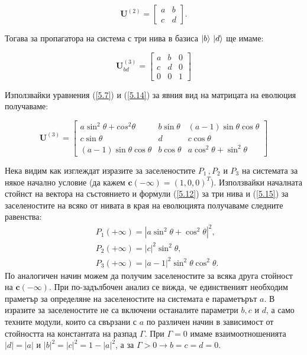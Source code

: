     \begin{equation}
        \textbf{U}^{(2)} = \begin{bmatrix}
            a & b\\
            c & d
        \end{bmatrix}.
    \end{equation}

    Тогава за пропагатора на система с три нива в базиса $\ket{b} \, \ket{d}$ ще имаме:

    \begin{equation} \label{5.14}
        \textbf{U}_{bd}^{(3)} = \begin{bmatrix}
            a & b & 0\\
            c & d & 0\\
            0 & 0 & 1
        \end{bmatrix}
    \end{equation}

    Използвайки уравнения (\ref{5.7}) и (\ref{5.14}) за явния вид на матрицата на еволюция получаваме:

    \begin{equation} \label{5.15}
        \textbf{U}^{(3)} = \begin{bmatrix}
            a\sin^2\theta + cos^2\theta & b\sin\theta & (a-1)\sin\theta\cos\theta\\
            c\sin\theta & d & c\cos\theta\\
            (a-1)\sin\theta\cos\theta & b\cos\theta & a\cos^2\theta + \sin^2\theta
        \end{bmatrix}
    \end{equation}
    
    Нека видим как изглеждат изразите за заселеностите $P_1 \, , P_2$ и $P_3$ на системата за някое начално условие (да кажем $\textbf{c}(-\infty)=(1,0,0)^T$).
    Използвайки началната стойнст на вектора на състоянието и формули (\ref{5.12}) за три нива и (\ref{5.15}) за заселеностите на всяко от нивата в края на еволюцията
    получаваме следните равенства:
    \begin{subequations}
        \begin{align}
            & P_1(+\infty) = \left|a\sin^2\theta+\cos^2\theta\right|^2,\\
            & P_2(+\infty) = \left|c\right|^2\sin^2\theta,\\
            & P_3(+\infty) = \left|a-1\right|^2\sin^2\theta\cos^2\theta.
        \end{align}
    \end{subequations}
    По аналогичен начин можем да получим заселеностите за всяка друга стойност на $\textbf{c}(-\infty)$. При по-задълбочен анализ се вижда, че единственият необходим
    праметър за определяне на заселеностите на системата е параметърът $a$. В изразите за заселеностите не са включени останалите параметри $b,c$ и $d$, а само
    техните модули, които са свързани с $a$ по различен начин в зависимост от стойността на константата на разпад $\Gamma$. При $\Gamma = 0$ имаме взаимоотношенията
    $|d|=|a|$ и $|b|^2=|c|^2=1-|a|^2$, а за $\Gamma>0 \rightarrow b=c=d=0$.

